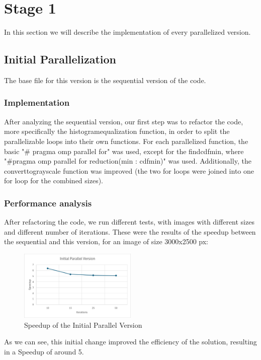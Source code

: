 \documentclass[sigconf]{acmart}
\begin{document}
\section{Stage 1}
In this section we will describe the implementation of every parallelized version.
\subsection{Initial Parallelization}
The base file for this version is the sequential version of the code.
\subsubsection{Implementation}
After analyzing the sequential version, our first step was to refactor the code, more specifically the histogram\textunderscore equalization function, in order to split the parallelizable loops into their own functions. For each parallelized function, the basic "\# pragma omp parallel for" was used, except for the find\textunderscore cdf\textunderscore min, where "\#pragma omp parallel for reduction(min : cdf\textunderscore min)" was used. Additionally, the convert\textunderscore to\textunderscore grayscale function was improved (the two for loops were joined into one for loop for the combined sizes).
\subsubsection{Performance analysis}
After refactoring the code, we run different tests, with images with different sizes and different number of iterations. These were the results of the speedup between the sequential and this version, for an image of size 3000x2500 px:

\begin{figure}[h]
    \centering
    \includegraphics[width=0.5\textwidth]{InitialParallelSpeedup.png}
    \caption{Speedup of the Initial Parallel Version}
\end{figure}

As we can see, this initial change improved the efficiency of the solution, resulting in a Speedup of around 5.
\end{document}
